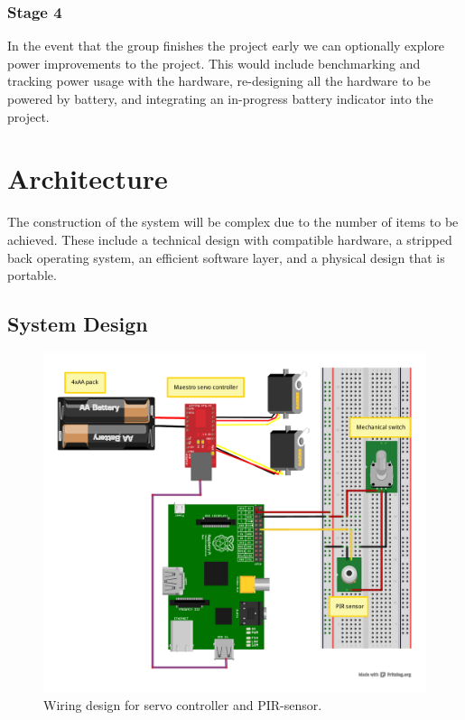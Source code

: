 \documentclass[11pt,a4paper,titlepage]{report}
\begin{document}
\subsubsection{Stage 4}

In the event that the group finishes the project early we can optionally explore power improvements to the project. This would include benchmarking and tracking power usage with the hardware, re-designing all the hardware to be powered by battery, and integrating an in-progress battery indicator into the project.



\section{Architecture}

The construction of the system will be complex due to the number of items to be achieved. These include a technical design with compatible hardware, a stripped back operating system, an efficient software layer, and a physical design that is portable.

\subsection{System Design}

\begin{figure}
\centering
\includegraphics[width=1.0\textwidth]{graphs/init_bb.pdf}
\caption{Wiring design for servo controller and PIR-sensor.}
\label{fig:initbb}
\end{figure}
\end{document}
